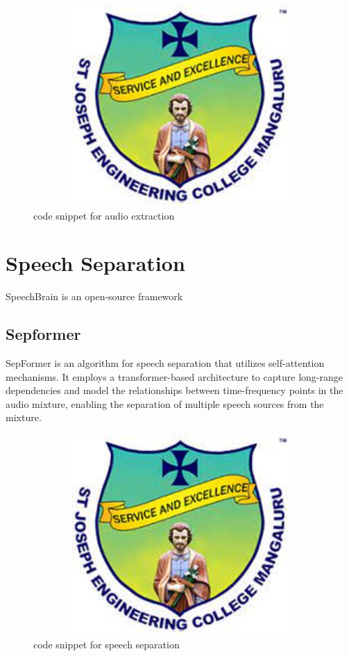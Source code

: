 \documentclass[12pt,a4paper]{report}
\begin{document}
\begin{figure}[hbtp]
\centering
\includegraphics[width=5in,height=3in]{./pic/sjeclogo.png}
\caption{code snippet for audio extraction}
\end{figure}

\section{Speech Separation}
\par SpeechBrain is an open-source framework 

\subsection{Sepformer}
\par SepFormer is an algorithm for speech separation that utilizes self-attention mechanisms. It employs a transformer-based architecture to capture long-range dependencies and model the relationships between time-frequency points in the audio mixture, enabling the separation of multiple speech sources from the mixture.


\begin{figure}[hbtp]
\centering
\includegraphics[width=5in,height=3in]{./pic/sjeclogo.png}
\caption{code snippet for speech separation}
\end{figure}
\end{document}
